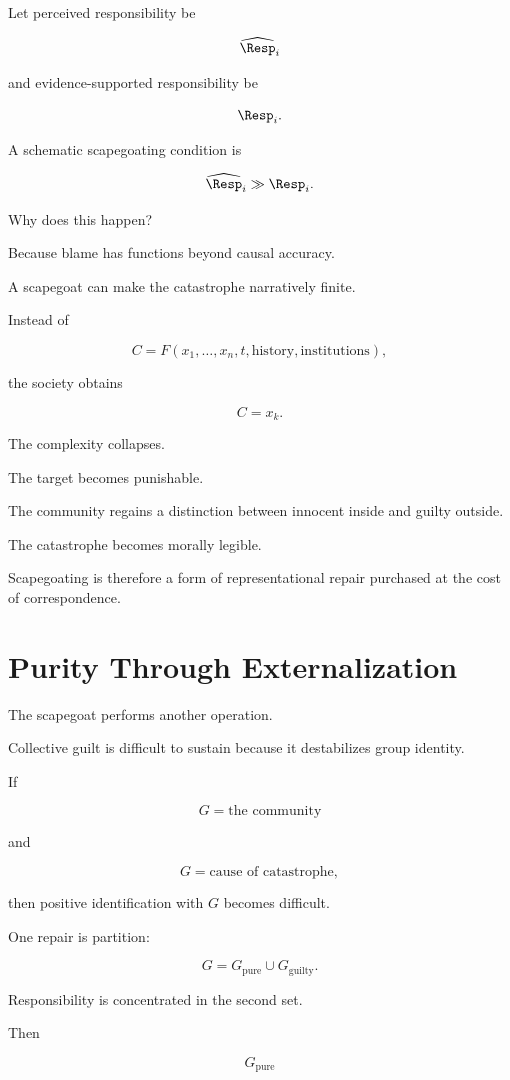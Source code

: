 \documentclass[11pt,oneside]{book}
\theoremstyle{definition}
\theoremstyle{remark}
\begin{document}
Let perceived responsibility be

\[
\widehat{\Resp}_i
\]

and evidence-supported responsibility be

\[
\Resp_i.
\]

A schematic scapegoating condition is

\[
\widehat{\Resp}_i
\gg
\Resp_i.
\]

Why does this happen?

Because blame has functions beyond causal accuracy.

A scapegoat can make the catastrophe narratively finite.

Instead of

\[
C
=
F(
x_1,\ldots,x_n,
t,
\text{history},
\text{institutions}
),
\]

the society obtains

\[
C=x_k.
\]

The complexity collapses.

The target becomes punishable.

The community regains a distinction between innocent inside and guilty outside.

The catastrophe becomes morally legible.

Scapegoating is therefore a form of representational repair purchased at the cost of correspondence.

\section{Purity Through Externalization}

The scapegoat performs another operation.

Collective guilt is difficult to sustain because it destabilizes group identity.

If

\[
G
=
\text{the community}
\]

and

\[
G
=
\text{cause of catastrophe},
\]

then positive identification with \(G\) becomes difficult.

One repair is partition:

\[
G
=
G_{\mathrm{pure}}
\cup
G_{\mathrm{guilty}}.
\]

Responsibility is concentrated in the second set.

Then

\[
G_{\mathrm{pure}}
\]
\end{document}
